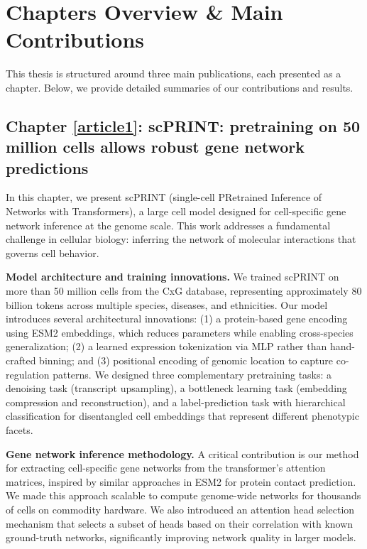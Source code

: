 \section{Chapters Overview \& Main Contributions}

This thesis is structured around three main publications, each presented as a chapter. Below, we
provide detailed summaries of our contributions and results.

\subsection{Chapter \ref{article1}: scPRINT: pretraining on 50 million cells allows robust gene network predictions}

In this chapter, we present \gls{scPRINT} (single-cell PRetrained Inference of Networks with
Transformers), a large cell model designed for cell-specific gene network inference at the genome
scale. This work addresses a fundamental challenge in cellular biology: inferring the network of
molecular interactions that governs cell behavior.

\textbf{Model architecture and training innovations.} We trained \gls{scPRINT} on more than 50
million cells from the \gls{CxG} database, representing approximately 80 billion tokens across
multiple species, diseases, and ethnicities. Our model introduces several architectural
innovations: (1) a protein-based gene encoding using \gls{ESM}2 embeddings, which reduces
parameters while enabling cross-species generalization; (2) a learned expression tokenization via
\gls{MLP} rather than hand-crafted binning; and (3) positional encoding of genomic location to
capture co-regulation patterns. We designed three complementary pretraining tasks: a denoising
task (transcript upsampling), a bottleneck learning task (embedding compression and
reconstruction), and a label-prediction task with hierarchical classification for disentangled
cell embeddings that represent different phenotypic facets.

\textbf{Gene network inference methodology.} A critical contribution is our method for extracting
cell-specific gene networks from the transformer's attention matrices, inspired by similar
approaches in \gls{ESM}2 for protein contact prediction. We made this approach scalable to compute
genome-wide networks for thousands of cells on commodity hardware. We also introduced an attention
head selection mechanism that selects a subset of heads based on their correlation with known
ground-truth networks, significantly improving network quality in larger models.

